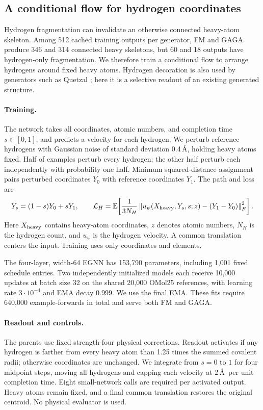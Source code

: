 \subsection{A conditional flow for hydrogen coordinates}\label{app:hydrogen-readout}
Hydrogen fragmentation can invalidate an otherwise connected heavy-atom skeleton. Among 512 cached training outputs per generator, FM and GAGA produce 346 and 314 connected heavy skeletons, but 60 and 18 outputs have hydrogen-only fragmentation. We therefore train a conditional flow to arrange hydrogens around fixed heavy atoms. Hydrogen decoration is also used by generators such as Quetzal \citep{cheng2025quetzal}; here it is a selective readout of an existing generated structure.

\paragraph{Training.}
The network takes all coordinates, atomic numbers, and completion time $s\in[0,1]$, and predicts a velocity for each hydrogen. We perturb reference hydrogens with Gaussian noise of standard deviation 0.4\,\AA, holding heavy atoms fixed. Half of examples perturb every hydrogen; the other half perturb each independently with probability one half. Minimum squared-distance assignment pairs perturbed coordinates $Y_0$ with reference coordinates $Y_1$. The path and loss are
\begin{equation}
 Y_s=(1-s)Y_0+sY_1,\qquad
 \mathcal L_H=\mathbb E\!\left[\frac{1}{3N_H}
 \left\|u_\psi(X_{\rm heavy},Y_s,s;z)-(Y_1-Y_0)\right\|_F^2\right].
\end{equation}
Here $X_{\rm heavy}$ contains heavy-atom coordinates, $z$ denotes atomic numbers, $N_H$ is the hydrogen count, and $u_\psi$ is the hydrogen velocity. A common translation centers the input. Training uses only coordinates and elements.

The four-layer, width-64 EGNN has 153,790 parameters, including 1,001 fixed schedule entries. Two independently initialized models each receive 10,000 updates at batch size 32 on the shared 20,000 OMol25 references, with learning rate $3\cdot10^{-4}$ and EMA decay 0.999. We use the final EMA. These fits require 640,000 example-forwards in total and serve both FM and GAGA.

\paragraph{Readout and controls.}
The parents use fixed strength-four physical corrections. Readout activates if any hydrogen is farther from every heavy atom than 1.25 times the summed covalent radii; otherwise coordinates are unchanged. We integrate from $s=0$ to $1$ for four midpoint steps, moving all hydrogens and capping each velocity at 2\,\AA\ per unit completion time. Eight small-network calls are required per activated output. Heavy atoms remain fixed, and a final common translation restores the original centroid. No physical evaluator is used.


